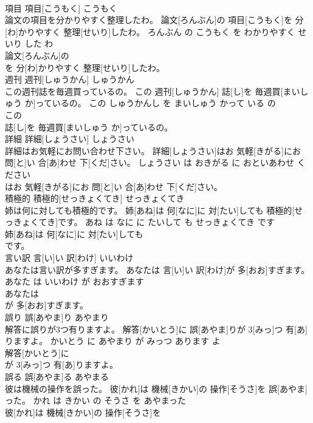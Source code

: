 \documentclass[8pt]{extreport}
\begin{document}
\begin{CJK}{UTF8}{min}
\\	項目	項目[こうもく]	こうもく	
\\	論文の項目を分かりやすく整理したわ。	論文[ろんぶん]の 項目[こうもく]を 分[わ]かりやすく 整理[せいり]したわ。	ろんぶん の こうもく を わかりやすく せいり した わ	
\\	論文[ろんぶん]の
\\	を 分[わ]かりやすく 整理[せいり]したわ。			
\\	週刊	週刊[しゅうかん]	しゅうかん	
\\	この週刊誌を毎週買っているの。	この 週刊[しゅうかん] 誌[し]を 毎週買[まいしゅう か]っているの。	この しゅうかんし を まいしゅう かって いる の	
\\	この
\\	誌[し]を 毎週買[まいしゅう か]っているの。			
\\	詳細	詳細[しょうさい]	しょうさい	
\\	詳細はお気軽にお問い合わせ下さい。	詳細[しょうさい]はお 気軽[きがる]にお 問[と]い 合[あ]わせ 下[くだ]さい。	しょうさい は おきがる に おといあわせ ください	
\\	はお 気軽[きがる]にお 問[と]い 合[あ]わせ 下[くだ]さい。			
\\	積極的	積極的[せっきょくてき]	せっきょくてき	
\\	姉は何に対しても積極的です。	姉[あね]は 何[なに]に 対[たい]しても 積極的[せっきょくてき]です。	あね は なに に たいして も せっきょくてき です	
\\	姉[あね]は 何[なに]に 対[たい]しても
\\	です。			
\\	言い訳	言[い]い 訳[わけ]	いいわけ	
\\	あなたは言い訳が多すぎます。	あなたは 言[い]い 訳[わけ]が 多[おお]すぎます。	あなた は いいわけ が おおすぎます	
\\	あなたは
\\	が 多[おお]すぎます。			
\\	誤り	誤[あやま]り	あやまり	
\\	解答に誤りが3つ有りますよ。	解答[かいとう]に 誤[あやま]りが 3[みっ]つ 有[あ]りますよ。	かいとう に あやまり が みっつ あります よ	
\\	解答[かいとう]に
\\	が 3[みっ]つ 有[あ]りますよ。			
\\	誤る	誤[あやま]る	あやまる	
\\	彼は機械の操作を誤った。	彼[かれ]は 機械[きかい]の 操作[そうさ]を 誤[あやま]った。	かれ は きかい の そうさ を あやまった	
\\	彼[かれ]は 機械[きかい]の 操作[そうさ]を

\end{CJK}
\end{document}
